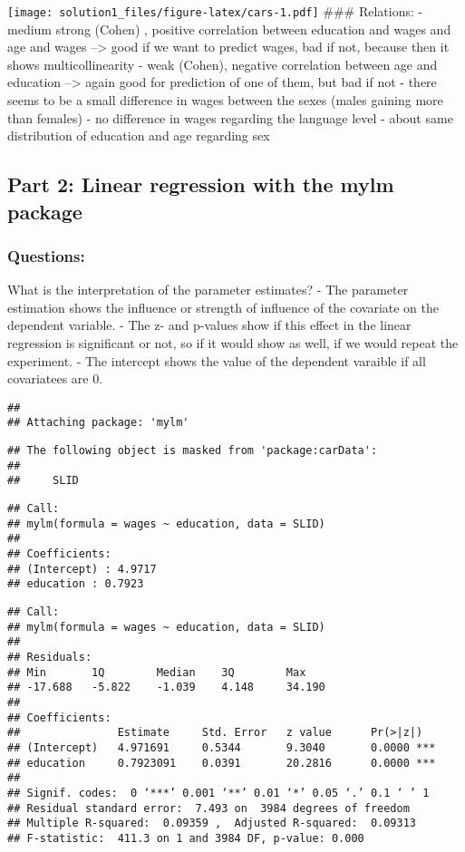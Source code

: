 \documentclass[
]{article}
\begin{document}
\texttt{[image: solution1\_files/figure-latex/cars-1.pdf]} \#\#\#
Relations: - medium strong (Cohen) , positive correlation between
education and wages and age and wages --\textgreater{} good if we want
to predict wages, bad if not, because then it shows multicollinearity -
weak (Cohen), negative correlation between age and education
--\textgreater{} again good for prediction of one of them, but bad if
not - there seems to be a small difference in wages between the sexes
(males gaining more than females) - no difference in wages regarding the
language level - about same distribution of education and age regarding
sex

\hypertarget{part-2-linear-regression-with-the-mylm-package}{%
\subsection{Part 2: Linear regression with the mylm
package}\label{part-2-linear-regression-with-the-mylm-package}}

\hypertarget{questions}{%
\subsubsection{Questions:}\label{questions}}

What is the interpretation of the parameter estimates? - The parameter
estimation shows the influence or strength of influence of the covariate
on the dependent variable. - The z- and p-values show if this effect in
the linear regression is significant or not, so if it would show as
well, if we would repeat the experiment. - The intercept shows the value
of the dependent varaible if all covariatees are 0.

\begin{verbatim}
## 
## Attaching package: 'mylm'
\end{verbatim}

\begin{verbatim}
## The following object is masked from 'package:carData':
## 
##     SLID
\end{verbatim}

\begin{verbatim}
## Call:
## mylm(formula = wages ~ education, data = SLID)
## 
## Coefficients:
## (Intercept) : 4.9717 
## education : 0.7923
\end{verbatim}

\begin{verbatim}
## Call:
## mylm(formula = wages ~ education, data = SLID)
## 
## Residuals:
## Min       1Q        Median    3Q        Max       
## -17.688   -5.822    -1.039    4.148     34.190    
## 
## Coefficients:
##               Estimate     Std. Error   z value      Pr(>|z|)     
## (Intercept)   4.971691     0.5344       9.3040       0.0000 ***   
## education     0.7923091    0.0391       20.2816      0.0000 ***   
## 
## Signif. codes:  0 ‘***’ 0.001 ‘**’ 0.01 ‘*’ 0.05 ‘.’ 0.1 ‘ ’ 1
## Residual standard error:  7.493 on  3984 degrees of freedom 
## Multiple R-squared:  0.09359 ,  Adjusted R-squared:  0.09313 
## F-statistic:  411.3 on 1 and 3984 DF, p-value: 0.000
\end{verbatim}
\end{document}
